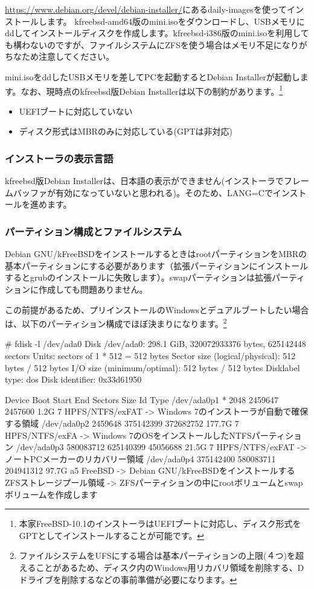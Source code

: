 \documentclass[mingoth,a4paper]{jsarticle}
\begin{document}
\url{https://www.debian.org/devel/debian-installer/}にあるdaily-imagesを使ってインストールします。
kfreebsd-amd64版のmini.isoをダウンロードし、USBメモリにddしてインストールディスクを作成します。kfreebsd-i386版のmini.isoを利用しても構わないのですが、ファイルシステムにZFSを使う場合はメモリ不足になりがちなため注意してください。

mini.isoをddしたUSBメモリを差してPCを起動するとDebian Installerが起動します。なお、現時点のkfreebsd版Debian Installerは以下の制約があります。\footnote{本家FreeBSD-10.1のインストーラはUEFIブートに対応し、ディスク形式をGPTとしてインストールすることが可能です。}
\begin{itemize}
  \item UEFIブートに対応していない
  \item ディスク形式はMBRのみに対応している(GPTは非対応)
\end{itemize}


\subsubsection{インストーラの表示言語}

kfreebsd版Debian Installerは、日本語の表示ができません(インストーラでフレームバッファが有効になっていないと思われる)。そのため、LANG=Cでインストールを進めます。

\subsubsection{パーティション構成とファイルシステム}

Debian GNU/kFreeBSDをインストールするときはrootパーティションをMBRの基本パーティションにする必要があります（拡張パーティションにインストールするとgrubのインストールに失敗します）。swapパーティションは拡張パーティションに作成しても問題ありません。

この前提があるため、プリインストールのWindowsとデュアルブートしたい場合は、以下のパーティション構成でほぼ決まりになります。\footnote{ファイルシステムをUFSにする場合は基本パーティションの上限(４つ)を超えることがあるため、ディスク内のWindows用リカバリ領域を削除する、Dドライブを削除するなどの事前準備が必要になります。}

\begin{commandline}
# fdisk -l /dev/ada0
Disk /dev/ada0: 298.1 GiB, 320072933376 bytes, 625142448 sectors
Units: sectors of 1 * 512 = 512 bytes
Sector size (logical/physical): 512 bytes / 512 bytes
I/O size (minimum/optimal): 512 bytes / 512 bytes
Disklabel type: dos
Disk identifier: 0x33d61950

Device      Boot     Start       End   Sectors   Size Id Type
/dev/ada0p1 *         2048   2459647   2457600   1.2G  7 HPFS/NTFS/exFAT
  -> Windows 7のインストーラが自動で確保する領域
/dev/ada0p2        2459648 375142399 372682752 177.7G  7 HPFS/NTFS/exFA
  -> Windows 7のOSをインストールしたNTFSパーティション
/dev/ada0p3      580083712 625140399  45056688  21.5G  7 HPFS/NTFS/exFAT
  -> ノートPCメーカーのリカバリー領域
/dev/ada0p4      375142400 580083711 204941312  97.7G a5 FreeBSD
  -> Debian GNU/kFreeBSDをインストールするZFSストレージプール領域
  -> ZFSパーティションの中にrootボリュームとswapボリュームを作成します
\end{commandline}
\end{document}
